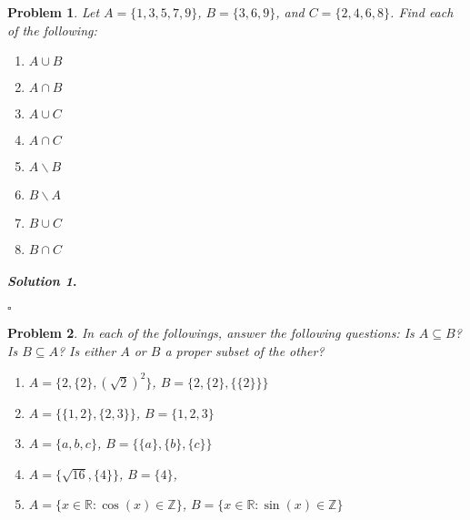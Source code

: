 \documentclass{amsart}
\theoremstyle{plain}
\newtheorem{problem}{Problem}
\newenvironment{solution}{\paragraph{\emph{Solution 1}.}}{\hfill$\square$}
\begin{document}
\begin{problem}
Let $A = \{1,3,5,7,9 \}$, $B = \{3,6,9 \}$, and $C = \{2,4,6,8 \}$.  Find each of the following:
\begin{enumerate}
\item $A \cup B$
\item $A \cap B$
\item $A \cup C$
\item $A \cap C$
\item $A \smallsetminus B$
\item $B \smallsetminus A$
\item $B \cup C$
\item $B \cap C$
\end{enumerate}
\end{problem}
\begin{solution}
\end{solution}

\begin{problem}
In each of the followings, answer the following questions:  Is $A \subseteq B$?  Is $B \subseteq A$?  Is either $A$ or $B$ a proper subset of the other?
\begin{enumerate}
\item $A = \{2, \{2 \}, (\sqrt{2})^{2} \}$, $B = \{2, \{2\},\{\{2\}\} \}$ 
\item $A = \{ \{ 1,2\}, \{2,3\}\}$, $B = \{1,2,3 \}$
\item $A = \{a,b,c \}$, $B = \{\{a\}, \{ b\}, \{c\} \}$
\item $A = \{\sqrt{16}, \{4 \} \}$, $B = \{4\}$,
\item $A = \{ x \in \mathbb{R} : \cos(x) \in \mathbb{Z} \}$, $B = \{x \in \mathbb{R} : \sin(x) \in \mathbb{Z} \}$
\end{enumerate}
\end{problem}
\end{document}
